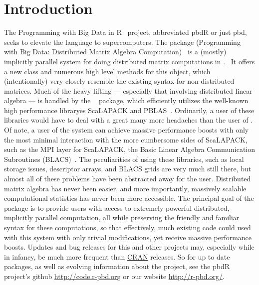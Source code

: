
\section[]{Introduction}
\label{sec:introduction}

The Programming with Big Data in R~\citep{pbdr2012} project, abbreviated pbdR or just pbd, seeks to elevate the  language to supercomputers.  
The  package (Programming with Big Data: Distributed Matrix Algebra Computation)~\citep{Schmidt2012pbdDMATpackage} is a (mostly) implicitly parallel system for doing distributed matrix computations in .~\citep{Rcore}  It offers a new  class  and numerous high level methods for this object, which (intentionally) very closely resemble the existing  syntax for non-distributed matrices.  Much of the heavy lifting --- especially that involving distributed linear algebra --- is handled by the ~\citep{Schmidt2012pbdBASEpackage} package, which efficiently utilizes the well-known high performance libraryes ScaLAPACK and PBLAS~\citep{slug}.
\np
Ordinarily, a user of these libraries would have to deal with a great many more headaches than the user of .  Of note, a user of the  system can achieve massive performance boosts with only the most minimal interaction with the more cumbersome sides of ScaLAPACK, such as the MPI layer for ScaLAPACK, the Basic Linear Algebra Communication Subroutines (BLACS)~\citep{blug}.  The peculiarities of using these libraries, such as local storage issues, descriptor arrays, and BLACS grids are very much still there, but almost all of these problems have been abstracted away for the user.  Distributed matrix algebra has never been easier, and more importantly, massively scalable computational statistics has never been more accessible.
\np
The principal goal of the  package is to provide  users with access to extremely powerful distributed, implicitly parallel computation, all while preserving the friendly and familiar  syntax for these computations, so that effectively, much existing  code could used with this system with only trivial modifications, yet receive massive performance boosts.  Updates and bug releases for this and other  projects may, especially while in infancy, be much more frequent than \href{http://cran.r-project.org/}{CRAN} releases.  So for up to date packages, as well as evolving information about the  project,  see the pbdR project's github \url{http://code.r-pbd.org} or our website \href{http://r-pbd.org/}{http://r-pbd.org/}.






